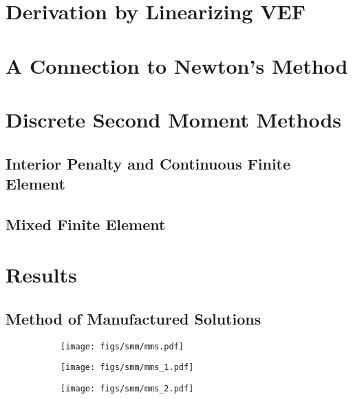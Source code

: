 \documentclass[../doc.tex]{subfiles}
\begin{document}
\section{Derivation by Linearizing VEF}

\section{A Connection to Newton's Method}

\section{Discrete Second Moment Methods}
\subsection{Interior Penalty and Continuous Finite Element}

\subsection{Mixed Finite Element}

\section{Results}

\subsection{Method of Manufactured Solutions}
\begin{figure}
\centering
\begin{subfigure}{.4\textwidth}
	\centering
	\texttt{[image: figs/smm/mms.pdf]}
	\caption{}
\end{subfigure}
\begin{subfigure}{.4\textwidth}
	\centering
	\texttt{[image: figs/smm/mms\_1.pdf]}
	\caption{}
\end{subfigure}
\begin{subfigure}{.4\textwidth}
	\centering
	\texttt{[image: figs/smm/mms\_2.pdf]}
	\caption{}
\end{subfigure}
\end{figure}

\begin{table}
\centering
\caption{}
\label{}

\end{table}
\end{document}
